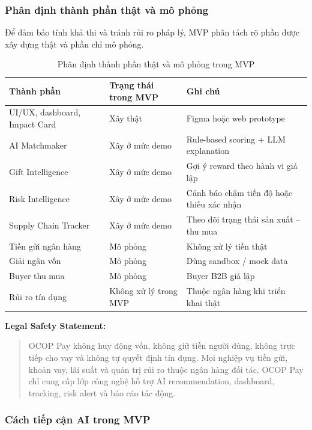 \documentclass[13pt,a4paper]{extarticle}
\begin{document}
\subsubsection{Phân định thành phần thật và mô phỏng}

Để đảm bảo tính khả thi và tránh rủi ro pháp lý, MVP phân tách rõ phần được xây dựng thật và phần chỉ mô phỏng.

\begin{table}[H]
\centering
\caption{Phân định thành phần thật và mô phỏng trong MVP}
\begin{tabular}{|p{4.5cm}|p{3.5cm}|p{5cm}|}
\hline
\textbf{Thành phần} & \textbf{Trạng thái trong MVP} & \textbf{Ghi chú} \\
\hline
UI/UX, dashboard, Impact Card & Xây thật & Figma hoặc web prototype \\
\hline
AI Matchmaker & Xây ở mức demo & Rule-based scoring + LLM explanation \\
\hline
Gift Intelligence & Xây ở mức demo & Gợi ý reward theo hành vi giả lập \\
\hline
Risk Intelligence & Xây ở mức demo & Cảnh báo chậm tiến độ hoặc thiếu xác nhận \\
\hline
Supply Chain Tracker & Xây ở mức demo & Theo dõi trạng thái sản xuất -- thu mua \\
\hline
Tiền gửi ngân hàng & Mô phỏng & Không xử lý tiền thật \\
\hline
Giải ngân vốn & Mô phỏng & Dùng sandbox / mock data \\
\hline
Buyer thu mua & Mô phỏng & Buyer B2B giả lập \\
\hline
Rủi ro tín dụng & Không xử lý trong MVP & Thuộc ngân hàng khi triển khai thật \\
\hline
\end{tabular}
\end{table}

\textbf{Legal Safety Statement:}
\begin{quote}
OCOP Pay không huy động vốn, không giữ tiền người dùng, không trực tiếp cho vay và không tự quyết định tín dụng. Mọi nghiệp vụ tiền gửi, khoản vay, lãi suất và quản trị rủi ro thuộc ngân hàng đối tác. OCOP Pay chỉ cung cấp lớp công nghệ hỗ trợ AI recommendation, dashboard, tracking, risk alert và báo cáo tác động.
\end{quote}

\subsubsection{Cách tiếp cận AI trong MVP}
\end{document}
